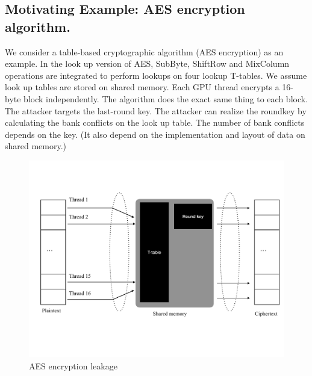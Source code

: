 \subsection{Motivating Example: AES encryption algorithm.}



We consider a table-based cryptographic algorithm (AES encryption) as an example.
%
In the look up version of AES,
SubByte, ShiftRow and MixColumn operations are integrated to perform lookups on four lookup T-tables.
%
We assume look up tables are stored on shared memory.
%
Each GPU thread encrypts a 16-byte block independently.
%
The algorithm does the exact same thing to each block.
%
%
The attacker targets the last-round key.
%
The attacker can realize the roundkey by calculating the bank conflicts on the look up table.
%
The number of bank conflicts depends on the key. 
%
(It also depend on the implementation and layout of data on shared memory.)

\begin{figure}[h]
    \centering
    \includegraphics[clip,trim=0 4cm 0 0cm,width=0.7\pdfpagewidth]{figs/AES1.pdf}
    \caption{AES encryption leakage }
\end{figure}




%













